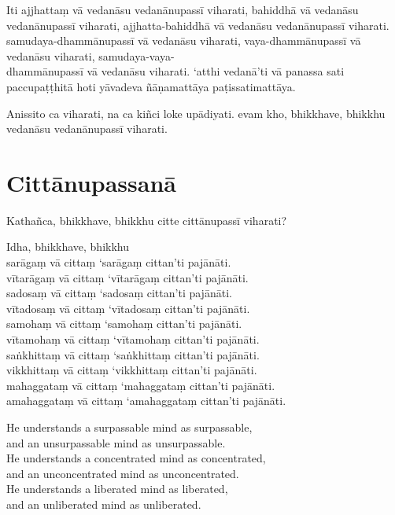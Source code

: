 \paliPage

Iti ajjhattaṃ vā vedanāsu vedanānupassī viharati, bahiddhā vā vedanāsu
vedanānupassī viharati, ajjhatta-bahiddhā vā vedanāsu vedanānupassī viharati.
samudaya-dhammānupassī vā vedanāsu viharati, vaya-dhammānupassī vā vedanāsu
viharati, samudaya-vaya-\\
dhammānupassī vā vedanāsu viharati. ‘atthi vedanā’ti vā panassa sati
paccupaṭṭhitā hoti yāvadeva ñāṇamattāya paṭissatimattāya.

Anissito ca viharati, na ca kiñci loke upādiyati. evam kho, bhikkhave, bhikkhu
vedanāsu vedanānupassī viharati.


\chapter*{Cittānupassanā}

Kathañca, bhikkhave, bhikkhu citte cittānupassī viharati?

Idha, bhikkhave, bhikkhu\\
sarāgaṃ vā cittaṃ ‘sarāgaṃ cittan’ti pajānāti.\\
vītarāgaṃ vā cittaṃ ‘vītarāgaṃ cittan’ti pajānāti.\\
sadosaṃ vā cittaṃ ‘sadosaṃ cittan’ti pajānāti.\\
vītadosaṃ vā cittaṃ ‘vītadosaṃ cittan’ti pajānāti.\\
samohaṃ vā cittaṃ ‘samohaṃ cittan’ti pajānāti.\\
vītamohaṃ vā cittaṃ ‘vītamohaṃ cittan’ti pajānāti.\\
saṅkhittaṃ vā cittaṃ ‘saṅkhittaṃ cittan’ti pajānāti.\\
vikkhittaṃ vā cittaṃ ‘vikkhittaṃ cittan’ti pajānāti.\\
mahaggataṃ vā cittaṃ ‘mahaggataṃ cittan’ti pajānāti.\\
amahaggataṃ vā cittaṃ ‘amahaggataṃ cittan’ti pajānāti.

\englishPage

He understands a surpassable mind as surpassable,\\
and an unsurpassable mind as unsurpassable.\\
He understands a concentrated mind as concentrated,\\
and an unconcentrated mind as unconcentrated.\\
He understands a liberated mind as liberated,\\
and an unliberated mind as unliberated.

